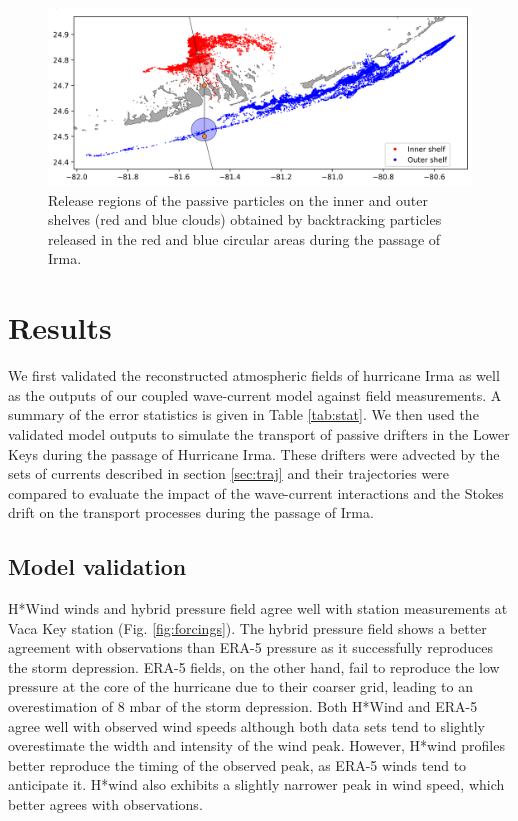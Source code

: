 \documentclass[preprint,12pt,authoryear]{elsarticle}
\begin{document}
\begin{figure}
    \centering
    \includegraphics[width=.9\textwidth]{fig/inner_outer_regions.png}
    \caption{Release regions of the passive particles on the inner and outer shelves (red and blue clouds) obtained by backtracking particles released in the red and blue circular areas during the passage of Irma.}
    \label{fig:init}
\end{figure}

\section{Results}

We first validated the reconstructed atmospheric fields of hurricane Irma as well as the outputs of our coupled wave-current model against field measurements. A summary of the error statistics is given in Table \ref{tab:stat}. We then used the validated model outputs to simulate the transport of passive drifters in the Lower Keys during the passage of Hurricane Irma. These drifters were advected by the sets of currents described in section \ref{sec:traj} and their trajectories were compared to evaluate the impact of the wave-current interactions and the Stokes drift on the transport processes during the passage of Irma.

\subsection{Model validation}

H*Wind winds and hybrid pressure field agree well with station measurements at Vaca Key station (Fig. \ref{fig:forcings}). The hybrid pressure field shows a better agreement with observations than ERA-5 pressure as it successfully reproduces the storm depression. ERA-5 fields, on the other hand, fail to reproduce the low pressure at the core of the hurricane due to their coarser grid, leading to an overestimation of 8 mbar of the storm depression. Both H*Wind and ERA-5 agree well with observed wind speeds although both data sets tend to slightly overestimate the width and intensity of the wind peak. However, H*wind profiles better reproduce the timing of the observed peak, as ERA-5 winds tend to anticipate it. H*wind also exhibits a slightly narrower peak in wind speed, which better agrees with observations.
\end{document}
